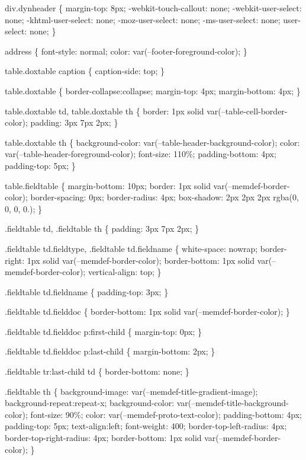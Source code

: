 div.\+dynheader \{ margin-\/top\+: 8px; -\/webkit-\/touch-\/callout\+: none; -\/webkit-\/user-\/select\+: none; -\/khtml-\/user-\/select\+: none; -\/moz-\/user-\/select\+: none; -\/ms-\/user-\/select\+: none; user-\/select\+: none; \}

address \{ font-\/style\+: normal; color\+: var(--footer-\/foreground-\/color); \}

table.\+doxtable caption \{ caption-\/side\+: top; \}

table.\+doxtable \{ border-\/collapse\+:collapse; margin-\/top\+: 4px; margin-\/bottom\+: 4px; \}

table.\+doxtable td, table.\+doxtable th \{ border\+: 1px solid var(--table-\/cell-\/border-\/color); padding\+: 3px 7px 2px; \}

table.\+doxtable th \{ background-\/color\+: var(--table-\/header-\/background-\/color); color\+: var(--table-\/header-\/foreground-\/color); font-\/size\+: 110\%; padding-\/bottom\+: 4px; padding-\/top\+: 5px; \}

table.\+fieldtable \{ margin-\/bottom\+: 10px; border\+: 1px solid var(--memdef-\/border-\/color); border-\/spacing\+: 0px; border-\/radius\+: 4px; box-\/shadow\+: 2px 2px 2px rgba(0, 0, 0, 0.); \}

.fieldtable td, .fieldtable th \{ padding\+: 3px 7px 2px; \}

.fieldtable td.\+fieldtype, .fieldtable td.\+fieldname \{ white-\/space\+: nowrap; border-\/right\+: 1px solid var(--memdef-\/border-\/color); border-\/bottom\+: 1px solid var(--memdef-\/border-\/color); vertical-\/align\+: top; \}

.fieldtable td.\+fieldname \{ padding-\/top\+: 3px; \}

.fieldtable td.\+fielddoc \{ border-\/bottom\+: 1px solid var(--memdef-\/border-\/color); \}

.fieldtable td.\+fielddoc p\+:first-\/child \{ margin-\/top\+: 0px; \}

.fieldtable td.\+fielddoc p\+:last-\/child \{ margin-\/bottom\+: 2px; \}

.fieldtable tr\+:last-\/child td \{ border-\/bottom\+: none; \}

.fieldtable th \{ background-\/image\+: var(--memdef-\/title-\/gradient-\/image); background-\/repeat\+:repeat-\/x; background-\/color\+: var(--memdef-\/title-\/background-\/color); font-\/size\+: 90\%; color\+: var(--memdef-\/proto-\/text-\/color); padding-\/bottom\+: 4px; padding-\/top\+: 5px; text-\/align\+:left; font-\/weight\+: 400; border-\/top-\/left-\/radius\+: 4px; border-\/top-\/right-\/radius\+: 4px; border-\/bottom\+: 1px solid var(--memdef-\/border-\/color); \}

